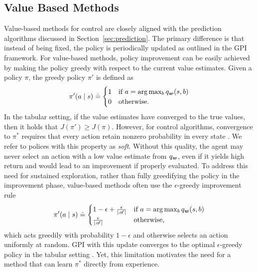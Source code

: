 \subsection{Value Based Methods}
Value-based methods for control are closely aligned with the prediction algorithms discussed in Section~\ref{sec:prediction}. The primary difference is that instead of being fixed, the policy is periodically updated as outlined in the GPI framework. For value-based methods, policy improvement can be easily achieved by making the policy greedy with respect to the current value estimates. Given a policy $\pi$, the greedy policy $\pi'$ is defined as
\begin{equation}
    \pi'(a \mid s) \doteq
    \begin{cases}
        1 & \text{if } a = \arg\max_{b} q_{\bm w}(s, b) \\
        0 & \text{otherwise.}
    \end{cases}
    \label{eq:greedy}
\end{equation}
In the tabular setting, if the value estimates have converged to the true values, then it holds that $J(\pi') \ge J(\pi)$. However, for control algorithms, convergence to $\pi^*$ requires that every action retain nonzero probability in every state . We refer to polices with this property as \textit{soft}. Without this quality, the agent may never select an action with a low value estimate from $q_{\bm w}$, even if it yields high return and would lead to an improvement if properly evaluated. 
To address this need for sustained exploration, rather than fully greedifying the policy in the improvement phase, value-based methods often use the $\epsilon$-greedy improvement rule
\begin{equation}
    \pi'(a \mid s) \doteq
    \begin{cases}
        1 - \epsilon + \frac{\epsilon}{|\mathscr{A}|} & \text{if } a = \arg\max_{b} q_{\bm w}(s, b) \\
        \frac{\epsilon}{|\mathscr{A}|} & \text{otherwise,}
    \end{cases}
    \label{eq:epsilon_greedy}
\end{equation}
which acts greedily with probability $1 - \epsilon$ and otherwise selects an action uniformly at random. GPI with this update converges to the optimal $\epsilon$-greedy policy in the tabular setting . Yet, this limitation motivates the need for a method that can learn $\pi^*$ directly from experience. 

